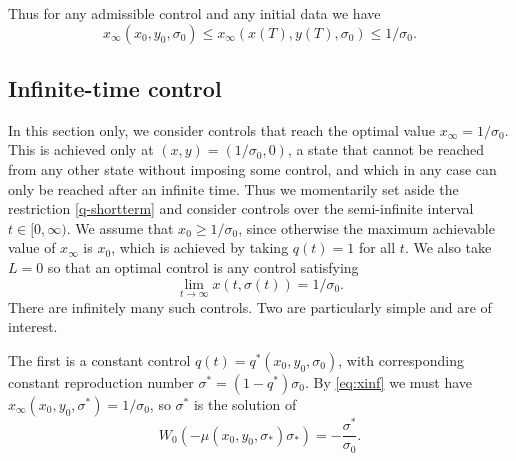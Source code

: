 \documentclass[english,12pt,letter]{article}
\newtheorem{thm}{Theorem}
\newtheorem{cor}{Corollary}
\newcommand{\Rnot}{\sigma_0}
\newcommand{\Sinf}{x_\infty}
\begin{document}
Thus for any admissible control and any initial data we have
$$
\Sinf(x_0,y_0,\Rnot) \le \Sinf(x(T),y(T),\Rnot) \le 1/\Rnot.
$$

%

\subsection{Infinite-time control}
In this section only, we consider controls that reach the optimal value $\Sinf = 1/\Rnot$.
This is achieved only at $(x,y)=(1/\Rnot,0)$, a state that cannot be reached
from any other state without imposing some control, and which in any case can
only be reached after an infinite time.  Thus we momentarily set aside the restriction
\eqref{q-shortterm} and consider controls over the semi-infinite interval $t\in[0,\infty)$.
We assume that $x_0\ge1/\Rnot$, since otherwise the maximum achievable value of $\Sinf$
is $x_0$, which is achieved by taking $q(t)=1$ for all $t$.
We also take $L=0$ so that an optimal control is any control satisfying
$$
    \lim_{t \to \infty} x(t,\sigma(t)) = 1/\Rnot.
$$
There are infinitely many such controls.  Two are particularly simple and
are of interest.

The first is a constant control $q(t) = q^*(x_0, y_0, \Rnot)$, with
corresponding constant reproduction number $\sigma^*=(1-q^*)\Rnot$.
By \eqref{eq:xinf} we must have $\Sinf(x_0,y_0,\sigma^*)=1/\Rnot$, so $\sigma^*$ is the solution of
$$
    W_0(-\mu(x_0,y_0,\sigma_*)\sigma_*) = -\frac{\sigma^*}{\sigma_0}.
$$
\end{document}
